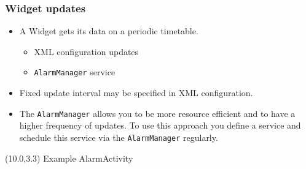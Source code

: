 \documentclass[10pt,xcolor=pdflatex]{beamer}
\begin{document}
\begin{frame}[fragile]\frametitle{Widget updates}
\begin{itemize}
	\item A Widget gets its data on a periodic timetable.
	  \begin{itemize}
		\item XML configuration updates
		\item \texttt{AlarmManager} service
	  \end{itemize}
    \item Fixed update interval may be specified in XML configuration.
	\item The \texttt{AlarmManager} allows you to be more resource efficient and to have a higher frequency of updates. To use this approach you define a service and schedule this service via the \texttt{AlarmManager} regularly.
\end{itemize}
\begin{textblock}{15}(10.0,3.3)
    {\footnotesize Example AlarmActivity}
\end{textblock}
\end{frame}
\end{document}
